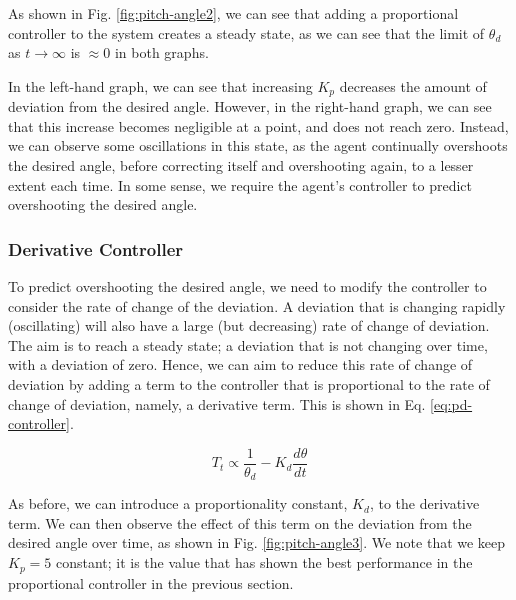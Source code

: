 \documentclass[12pt]{article}
\begin{document}
As shown in Fig. \ref{fig:pitch-angle2}, we can see that adding a proportional controller to the system creates a steady state, as we can see that the limit of $\theta_d$ as $t \to \infty$ is $\approx 0$ in both graphs.

In the left-hand graph, we can see that increasing $K_p$ decreases the amount of deviation from the desired angle. However, in the right-hand graph, we can see that this increase becomes negligible at a point, and does not reach zero. Instead, we can observe some oscillations in this state, as the agent continually overshoots the desired angle, before correcting itself and overshooting again, to a lesser extent each time. In some sense, we require the agent's controller to predict overshooting the desired angle.

\subsubsection{Derivative Controller}

To predict overshooting the desired angle, we need to modify the controller to consider the rate of change of the deviation. A deviation that is changing rapidly (oscillating) will also have a large (but decreasing) rate of change of deviation. The aim is to reach a steady state; a deviation that is not changing over time, with a deviation of zero. Hence, we can aim to reduce this rate of change of deviation by adding a term to the controller that is proportional to the rate of change of deviation, namely, a derivative term. This is shown in Eq. \ref{eq:pd-controller}.

\begin{equation}
    T_t \propto \frac{1}{\theta_d} - K_d \frac{d\theta}{dt}
    \label{eq:pd-controller}
\end{equation}

As before, we can introduce a proportionality constant, $K_d$, to the derivative term. We can then observe the effect of this term on the deviation from the desired angle over time, as shown in Fig. \ref{fig:pitch-angle3}. We note that we keep $K_p = 5$ constant; it is the value that has shown the best performance in the proportional controller in the previous section.
\end{document}
